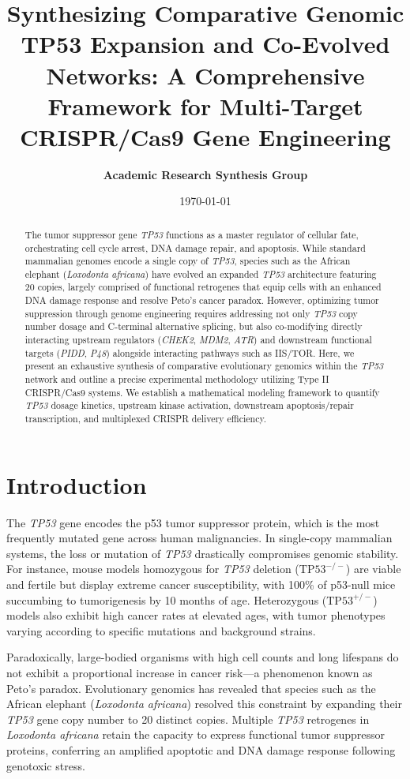 \documentclass[11pt,a4paper]{article}
\title{\textbf{Synthesizing Comparative Genomic TP53 Expansion and Co-Evolved Networks: A Comprehensive Framework for Multi-Target CRISPR/Cas9 Gene Engineering}}
\author{\textbf{Academic Research Synthesis Group}}
\date{\today}
\begin{document}
\maketitle

\begin{abstract}
The tumor suppressor gene \textit{TP53} functions as a master regulator of cellular fate, orchestrating cell cycle arrest, DNA damage repair, and apoptosis. While standard mammalian genomes encode a single copy of \textit{TP53}, species such as the African elephant (\textit{Loxodonta africana}) have evolved an expanded \textit{TP53} architecture featuring 20 copies, largely comprised of functional retrogenes that equip cells with an enhanced DNA damage response and resolve Peto's cancer paradox. However, optimizing tumor suppression through genome engineering requires addressing not only \textit{TP53} copy number dosage and C-terminal alternative splicing, but also co-modifying directly interacting upstream regulators (\textit{CHEK2}, \textit{MDM2}, \textit{ATR}) and downstream functional targets (\textit{PIDD}, \textit{P48}) alongside interacting pathways such as IIS/TOR. Here, we present an exhaustive synthesis of comparative evolutionary genomics within the \textit{TP53} network and outline a precise experimental methodology utilizing Type II CRISPR/Cas9 systems. We establish a mathematical modeling framework to quantify \textit{TP53} dosage kinetics, upstream kinase activation, downstream apoptosis/repair transcription, and multiplexed CRISPR delivery efficiency.
\end{abstract}

\section{Introduction}

The \textit{TP53} gene encodes the p53 tumor suppressor protein, which is the most frequently mutated gene across human malignancies. In single-copy mammalian systems, the loss or mutation of \textit{TP53} drastically compromises genomic stability. For instance, mouse models homozygous for \textit{TP53} deletion ($\text{TP53}^{-/-}$) are viable and fertile but display extreme cancer susceptibility, with 100\% of p53-null mice succumbing to tumorigenesis by 10 months of age. Heterozygous ($\text{TP53}^{+/-}$) models also exhibit high cancer rates at elevated ages, with tumor phenotypes varying according to specific mutations and background strains.

Paradoxically, large-bodied organisms with high cell counts and long lifespans do not exhibit a proportional increase in cancer risk—a phenomenon known as Peto's paradox. Evolutionary genomics has revealed that species such as the African elephant (\textit{Loxodonta africana}) resolved this constraint by expanding their \textit{TP53} gene copy number to 20 distinct copies. Multiple \textit{TP53} retrogenes in \textit{Loxodonta africana} retain the capacity to express functional tumor suppressor proteins, conferring an amplified apoptotic and DNA damage response following genotoxic stress.
\end{document}

